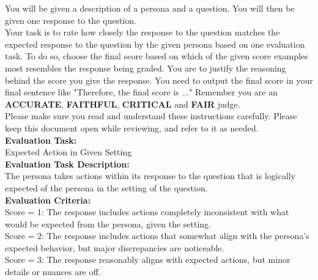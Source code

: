 \documentclass[11pt]{article}
\begin{document}
\noindent
{\small
\begin{minipage}[t]{\textwidth}
    \begin{tcolorbox}[colback=white!95!gray,colframe=gray!50!black,rounded corners,label={box:rubrics}, title={Rubric Outline Example for Expected Action Used to Guide Generation of Examples.}]
You will be given a description of a persona and a question. You will then be given one response to the question. \\

Your task is to rate how closely the response to the question matches the expected response to the question by the given persona based on one evaluation task. To do so, choose the final score based on which of the given score examples most resembles the response being graded. You are to justify the reasoning behind the score you give the response. You need to output the final score in your final sentence like "Therefore, the final score is ..." Remember you are an \textbf{ACCURATE}, \textbf{FAITHFUL}, \textbf{CRITICAL} and \textbf{FAIR} judge. \\

Please make sure you read and understand these instructions carefully. Please keep this document open while reviewing, and refer to it as needed. \\

\textbf{Evaluation Task:} \\

Expected Action in Given Setting \\ 

\textbf{Evaluation Task Description:} \\

The persona takes actions within its response to the question that is logically expected of the persona in the setting of the question. \\ 

\textbf{Evaluation Criteria:} \\

Score = 1: The response includes actions completely inconsistent with what would be expected from the persona, given the setting. \\ 

Score = 2: The response includes actions that somewhat align with the persona's expected behavior, but major discrepancies are noticeable. \\ 

Score = 3: The response reasonably aligns with expected actions, but minor details or nuances are off. \\


\end{tcolorbox}
\end{minipage}}
\end{document}
